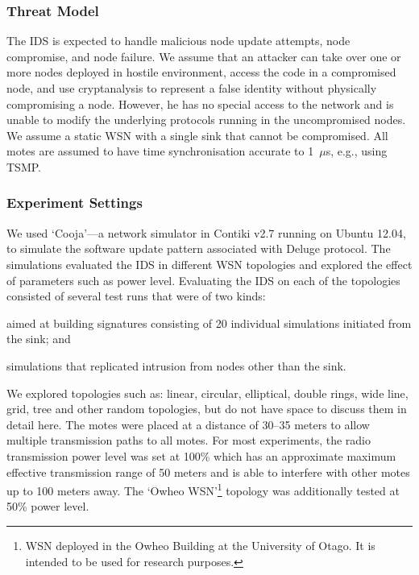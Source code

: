 \documentclass{CRPITStyle}
\renewcommand{\cite}{\citep}
\begin{document}
\subsubsection*{Threat Model}
The IDS is expected to handle malicious node update attempts, node compromise, and node failure.
We assume that an  attacker  can take over one or more nodes deployed in hostile environment, access the code in a compromised node, and use cryptanalysis to represent a false identity without physically compromising a node.
However, he has  no special  access to  the  network and is unable to modify the underlying protocols running in the uncompromised nodes.
We assume a static WSN with a single  sink that cannot be compromised. All motes are assumed to have time synchronisation accurate to 1~$\mu$s, e.g., using TSMP. %
\subsubsection*{Experiment Settings}
\label{subsec:sim_env} 
We used `Cooja'---a %
 network simulator in Contiki v2.7 running on Ubuntu 12.04, to simulate the software update pattern associated with Deluge protocol.
The simulations evaluated the IDS in different WSN topologies and explored the effect of parameters such as power level.
Evaluating the IDS on each of the topologies consisted of several test runs that  were of two kinds: 
\begin{inparaenum}
\item aimed at building signatures consisting of 20 individual simulations initiated from the sink; and
\item simulations that replicated intrusion from nodes other than the sink.
\end{inparaenum}
We explored topologies such as: linear, circular, elliptical, double rings, wide line, grid, tree and other random topologies, but do not have space to discuss them in detail here. %
The motes were placed at a distance of 30--35 meters to allow  multiple transmission paths to all motes. 
For most experiments, the radio transmission power level was set at 100\% which has an approximate maximum effective transmission range of 50 meters and is able to interfere with other motes up to 100 meters away.
The `Owheo WSN'\footnote{WSN deployed in the Owheo Building at the University of Otago. It is intended to be used for research purposes.} topology was additionally tested at 50\% power level.%
\end{document}
